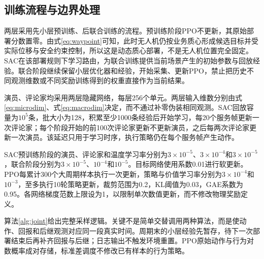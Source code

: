 \subsection{训练流程与边界处理}
两层采用先小层预训练、后联合训练的流程。预训练阶段PPO不更新，其原始部署分数置零。由式\eqref{eq:waypoint}可知，此时无人机仍按业务质心形成候选目标并受实际位移与安全约束控制，所以这是动态质心部署，不是无人机位置完全固定。SAC在该部署规则下学习路由，为联合训练提供当前场景产生的初始参数与回放经验。联合阶段继续保留小层优化器和经验，开始采集、更新PPO，禁止把历史不同观测维数或不同奖励训练得到的权重直接作为当前结果。

演员、评论家均采用两层隐藏网络，每层256个单元。两层输入维数分别由式\eqref{eq:microdim}、式\eqref{eq:macrodim}决定，而不通过补零伪装相同观测。SAC回放容量为$10^5$条，批大小为128，积累至少1000条经验后开始学习，每20个服务帧更新一次评论家；每个阶段开始的前100次评论家更新不更新演员，之后每两次评论家更新一次演员。该延迟只用于学习时序，执行策略仍在每个服务帧产生动作。

SAC预训练阶段的演员、评论家和温度学习率分别为$3\times10^{-5}$、$3\times10^{-4}$和$3\times10^{-5}$，联合阶段分别为$3\times10^{-5}$、$10^{-4}$和$10^{-5}$。目标网络使用系数0.01进行软更新。PPO每累计300个大周期样本执行一次更新，策略与价值学习率分别为$3\times10^{-4}$和$10^{-3}$，至多执行10轮策略更新，裁剪范围为0.2，KL阈值为0.03，GAE系数为0.95。各网络梯度范数上限设为1，以限制单次数值更新，而不修改物理奖励定义。

算法\ref{alg:joint}给出完整采样逻辑。关键不是简单交替调用两种算法，而是使动作、回报和后继观测对应同一段真实时间。周期末的小层经验先暂存，待下一次部署结束后再补齐回报与后继；日志输出不触发环境重置。PPO原始动作与行为对数概率成对存储，标准差调度不修改已有样本的行为策略。

